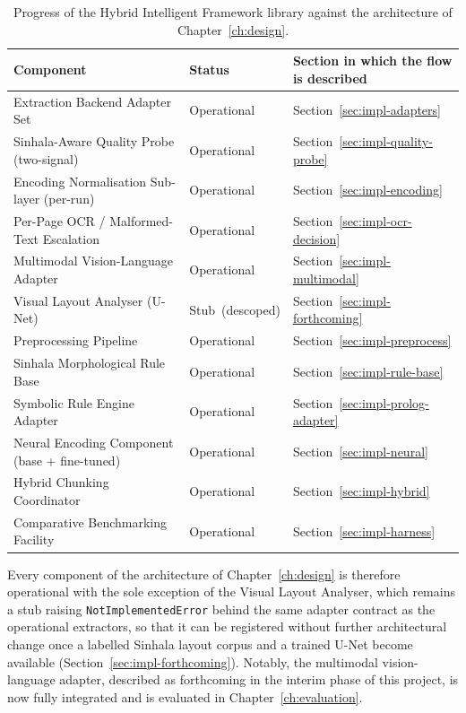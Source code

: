 \documentclass[12pt,a4paper,oneside]{report}
\begin{document}
\begin{table}[h]
\centering
\caption{Progress of the Hybrid Intelligent Framework library against the architecture of Chapter~\ref{ch:design}.}
\label{tab:impl-progress}
\renewcommand{\arraystretch}{1.25}
\footnotesize
\begin{tabularx}{\textwidth}{p{4.4cm} p{3.2cm} X}
\hline
\textbf{Component} & \textbf{Status} & \textbf{Section in which the flow is described} \\
\hline
Extraction Backend Adapter Set & Operational & Section~\ref{sec:impl-adapters} \\
\hline
Sinhala-Aware Quality Probe (two-signal) & Operational & Section~\ref{sec:impl-quality-probe} \\
\hline
Encoding Normalisation Sub-layer (per-run) & Operational & Section~\ref{sec:impl-encoding} \\
\hline
Per-Page OCR / Malformed-Text Escalation & Operational & Section~\ref{sec:impl-ocr-decision} \\
\hline
Multimodal Vision-Language Adapter & Operational & Section~\ref{sec:impl-multimodal} \\
\hline
Visual Layout Analyser (U-Net) & \mbox{Stub (descoped)} & Section~\ref{sec:impl-forthcoming} \\
\hline
Preprocessing Pipeline & Operational & Section~\ref{sec:impl-preprocess} \\
\hline
Sinhala Morphological Rule Base & Operational & Section~\ref{sec:impl-rule-base} \\
\hline
Symbolic Rule Engine Adapter & Operational & Section~\ref{sec:impl-prolog-adapter} \\
\hline
Neural Encoding Component (base + fine-tuned) & Operational & Section~\ref{sec:impl-neural} \\
\hline
Hybrid Chunking Coordinator & Operational & Section~\ref{sec:impl-hybrid} \\
\hline
Comparative Benchmarking Facility & Operational & Section~\ref{sec:impl-harness} \\
\hline
\end{tabularx}
\end{table}

Every component of the architecture of Chapter~\ref{ch:design} is therefore operational with the sole exception of the Visual Layout Analyser, which remains a stub raising \texttt{NotImplementedError} behind the same adapter contract as the operational extractors, so that it can be registered without further architectural change once a labelled Sinhala layout corpus and a trained U-Net become available (Section~\ref{sec:impl-forthcoming}). Notably, the multimodal vision-language adapter, described as forthcoming in the interim phase of this project, is now fully integrated and is evaluated in Chapter~\ref{ch:evaluation}.
\end{document}
